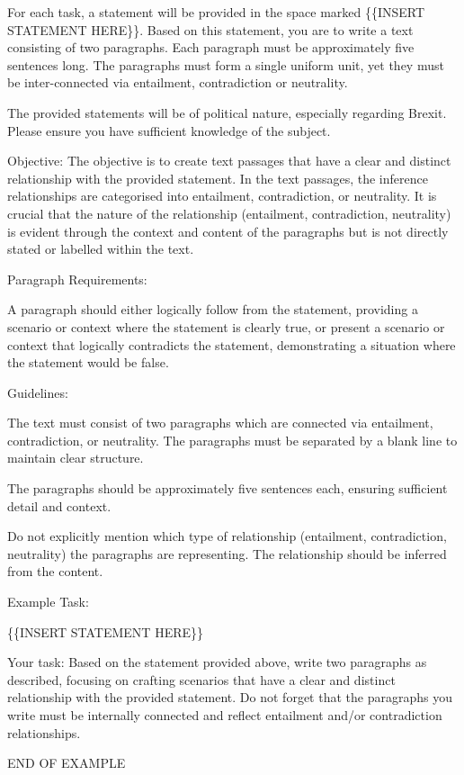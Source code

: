 \documentclass[fleqn,moreauthors,10pt]{ds_report}
\begin{document}
For each task, a statement will be provided in the space marked \{\{INSERT STATEMENT HERE\}\}. Based on this statement, you are to write a text consisting of two paragraphs. Each paragraph must be approximately five sentences long. The paragraphs must form a single uniform unit, yet they must be inter-connected via entailment, contradiction or neutrality.

The provided statements will be of political nature, especially regarding Brexit. Please ensure you have sufficient knowledge of the subject.

Objective: The objective is to create text passages that have a clear and distinct relationship with the provided statement. In the text passages, the inference relationships are categorised into entailment, contradiction, or neutrality. It is crucial that the nature of the relationship (entailment, contradiction, neutrality) is evident through the context and content of the paragraphs but is not directly stated or labelled within the text.

Paragraph Requirements:

A paragraph should either logically follow from the statement, providing a scenario or context where the statement is clearly true, or present a scenario or context that logically contradicts the statement, demonstrating a situation where the statement would be false.

Guidelines:

The text must consist of two paragraphs which are connected via entailment, contradiction, or neutrality. The paragraphs must be separated by a blank line to maintain clear structure.

The paragraphs should be approximately five sentences each, ensuring sufficient detail and context.

Do not explicitly mention which type of relationship (entailment, contradiction, neutrality) the paragraphs are representing. The relationship should be inferred from the content.

Example Task:

\{\{INSERT STATEMENT HERE\}\}

Your task: Based on the statement provided above, write two paragraphs as described, focusing on crafting scenarios that have a clear and distinct relationship with the provided statement. Do not forget that the paragraphs you write must be internally connected and reflect entailment and/or contradiction relationships.

END OF EXAMPLE
\end{document}
